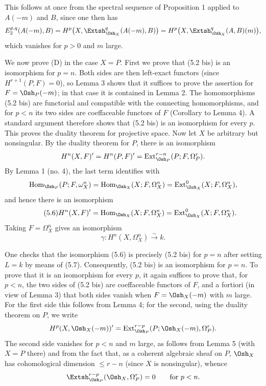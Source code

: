 This follows at once from the spectral sequence of Proposition 1 applied to
$A(-m)$ and $B$, since one then has
\[
  E_{2}^{p,q}(A(-m),B)
  =H^{p}\bigl(X,\Extsh_{\Osh_X}^{q}(A(-m),B)\bigr)
  =H^{p}\bigl(X,\Extsh_{\Osh_X}^{q}(A,B)(m)\bigr),
\]
which vanishes for $p>0$ and $m$ large.

We now prove (D) in the case $X=P$. First we prove that (5.2 bis) is an
isomorphism for $p=n$. Both sides are then left-exact functors (since
$H^{r+1}(P,F)=0$), so Lemma 3 shows that it suffices to prove the assertion for
$F=\Osh_P(-m)$; in that case it is contained in Lemma 2. The homomorphisms
(5.2 bis) are functorial and compatible with the connecting homomorphisms, and
for $p<n$ its two sides are coeffaceable functors of $F$ (Corollary to Lemma 4).
A standard argument therefore shows that (5.2 bis) is an isomorphism for every
$p$. This proves the duality theorem for projective space. Now let $X$ be
arbitrary but nonsingular. By the duality theorem for $P$, there is an
isomorphism
\[
  H^{n}(X,F)'=H^{n}(P,F)'
  =\operatorname{Ext}_{\Osh_P}^{r-n}(P;F,\Omega_P^{r}).
\]
By Lemma 1 (no. 4), the last term identifies with
\[
  \operatorname{Hom}_{\Osh_P}(P;F,\omega_X^{n})
  =\operatorname{Hom}_{\Osh_X}(X;F,\Omega_X^{n})
  =\operatorname{Ext}_{\Osh_X}^{0}(X;F,\Omega_X^{n}),
\]
and hence there is an isomorphism
\begin{equation}\tag{5.6}
  H^{n}(X,F)'=\operatorname{Hom}_{\Osh_X}(X;F,\Omega_X^{n})
  =\operatorname{Ext}_{\Osh_X}^{0}(X;F,\Omega_X^{n}).
\end{equation}
Taking $F=\Omega_X^{n}$ gives an isomorphism
\begin{equation}\tag{5.7}
  \gamma:H^{n}(X,\Omega_X^{n})\xrightarrow{\sim}k.
\end{equation}

One checks that the isomorphism (5.6) is precisely (5.2 bis) for $p=n$ after
setting $L=k$ by means of (5.7). Consequently, (5.2 bis) is an isomorphism for
$p=n$. To prove that it is an isomorphism for every $p$, it again suffices to
prove that, for $p<n$, the two sides of (5.2 bis) are coeffaceable functors of
$F$, and a fortiori (in view of Lemma 3) that both sides vanish when
$F=\Osh_X(-m)$ with $m$ large. For the first side this follows from Lemma 4; for
the second, using the duality theorem on $P$, we write
\[
  H^{p}(X,\Osh_X(-m))'
  =\operatorname{Ext}_{\Osh_P}^{r-p}
    (P;\Osh_X(-m),\Omega_P^{r}).
\]
The second side vanishes for $p<n$ and $m$ large, as follows from Lemma 5 (with
$X=P$ there) and from the fact that, as a coherent algebraic sheaf on $P$,
$\Osh_X$ has cohomological dimension $\leq r-n$ (since $X$ is nonsingular),
whence
\[
  \Extsh_{\Osh_P}^{r-p}(\Osh_X,\Omega_P^{r})=0
  \qquad\text{for }p<n.
\]

